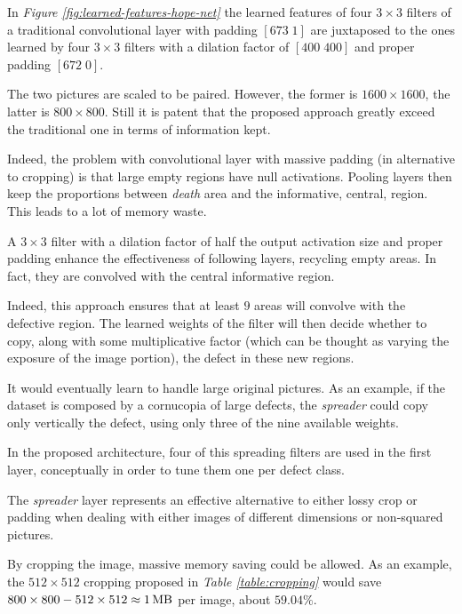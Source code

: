         \par{
            In \emph{Figure \ref{fig:learned-features-hope-net}} the learned features of four $3\times3$ filters of a traditional convolutional layer with padding $\left[673\;1\right]$ are juxtaposed to the ones learned by four $3\times 3$ filters with a dilation factor of $\left[400\;400\right]$ and proper padding $\left[672\;0\right]$. 
        }
        \par{
            The two pictures are scaled to be paired. However, the former is $1600 \times 1600$, the latter is $800\times 800$. Still it is patent that the proposed approach greatly exceed the traditional one in terms of information kept. 
        }
        \par{
            Indeed, the problem with convolutional layer with massive padding (in alternative to cropping) is that large empty regions have null activations. Pooling layers then keep the proportions between \emph{death} area and the informative, central, region. This leads to a lot of memory waste.
        }
        \par{
            A $3\times 3$ filter with a dilation factor of half the output activation size and proper padding enhance the effectiveness of following layers, recycling empty areas. In fact, they are convolved with the central informative region.
        }
        \par{
            Indeed, this approach ensures that at least $9$ areas will convolve with the defective region. The learned weights of the filter will then decide whether to copy, along with some multiplicative factor (which can be thought as varying the exposure of the image portion), the defect in these new regions.
        }
        \par{
            It would eventually learn to handle large original pictures. As an example, if the dataset is composed by a cornucopia of large defects, the \emph{spreader} could copy only vertically the defect, using only three of the nine available weights.
        }
        \par{
            In the proposed architecture, four of this spreading filters are used in the first layer, conceptually in order to tune them one per defect class.
        }
        \par{
            The \emph{spreader} layer represents an effective alternative to either lossy crop or padding when dealing with either images of different dimensions or non-squared pictures.
        }
        \par{
            By cropping the image, massive memory saving could be allowed. As an example, the $512\times 512$ cropping proposed in \emph{Table \ref{table:cropping}} would save $800\times 800 - 512\times 512 \approx \SI{1}{\mega\byte}$ per image, about $59.04\%$.
        }

